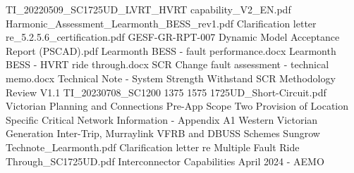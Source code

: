 \renewcommand\bibname{References}

\begin{thebibliography}{99}
	TI_20220509_SC1725UD_LVRT_HVRT capability_V2_EN.pdf
	Harmonic_Assessment_Learmonth_BESS_rev1.pdf
	Clarification letter re_5.2.5.6_certification.pdf
	GESF-GR-RPT-007 Dynamic Model Acceptance Report (PSCAD).pdf
	Learmonth BESS - fault performance.docx
	Learmonth BESS - HVRT ride through.docx
	SCR Change fault assessment - technical memo.docx
	Technical Note - System Strength Withstand SCR Methodology Review V1.1
	TI_20230708_SC1200 1375 1575 1725UD_Short-Circuit.pdf
	Victorian  Planning and Connections Pre-App Scope Two Provision of Location Specific Critical Network Information - Appendix A1
	Western Victorian Generation Inter-Trip, Murraylink VFRB and DBUSS Schemes
	Sungrow Technote_Learmonth.pdf 
	Clarification letter re Multiple Fault Ride Through_SC1725UD.pdf
	Interconnector Capabilities April 2024 - AEMO

\end{thebibliography}